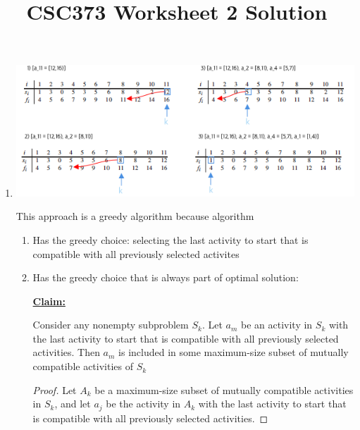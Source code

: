 \documentclass[12pt]{article}
\begin{document}
\title{CSC373 Worksheet 2 Solution}
\maketitle

\bigskip

\begin{enumerate}[1.]
    \item

    \begin{center}
    \includegraphics[width=\linewidth]{images/worksheet_2_solution_3.png}
    \end{center}

    \bigskip

    This approach is a greedy algorithm because algorithm

    \begin{enumerate}[1)]
        \item Has the greedy choice: selecting the last activity to start that is compatible
        with all previously selected activites

        \item Has the greedy choice that is always part of optimal solution:

        \bigskip

        \underline{\textbf{Claim:}}

        \bigskip

        Consider any nonempty subproblem $S_k$. Let $a_m$ be an activity in $S_k$
        with the last activity to start that is compatible with all previously selected
        activities. Then $a_m$ is included in some maximum-size subset of mutually
        compatible activities of $S_k$

        \begin{proof}
        Let $A_k$ be a maximum-size subset of mutually compatible activities in $S_k$,
        and let $a_j$ be the activity in $A_k$ with the last activity to start that is
        compatible with all previously selected activities.


\end{proof}
\end{enumerate}
\end{enumerate}
\end{document}
